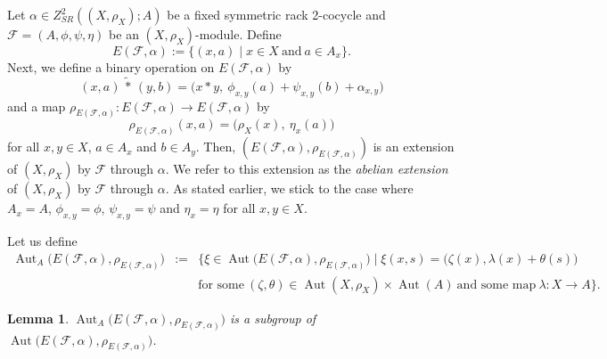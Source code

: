 \documentclass[11pt,reqno]{amsart}
\newtheorem{lemma}[theorem]{Lemma}
\theoremstyle{definition}
\numberwithin{equation}{subsection}
\begin{document}
Let $\alpha \in Z_{S R}^{2}((X, \rho_{X}); A)$ be a fixed symmetric rack 2-cocycle and $\mathcal{F}=(A, \phi, \psi, \eta)$ be an $(X, \rho_{X})$-module. Define
$$
E(\mathcal{F}, \alpha):=\big\{(x, a) \mid x \in X~\textrm{and}~ a \in A_{x} \big\}.
$$
Next, we define a binary operation on $E(\mathcal{F}, \alpha)$ by
$$
(x, a) \, \tilde{*} \,(y, b)=\big( x * y,~ \phi_{x, y}(a)+\psi_{x, y}(b)+\alpha_{x, y} \big)
$$
and a map $\rho_{E(\mathcal{F}, \alpha)}: E(\mathcal{F}, \alpha) \longrightarrow E(\mathcal{F}, \alpha)$ by
$$
\rho_{E(\mathcal{F}, \alpha)}(x, a) =\big(\rho_{X}(x), ~\eta_{x}(a)\big)
$$
for all $x, y \in X$, $a \in A_{x}$ and $b \in A_{y}$. Then, $(E(\mathcal{F}, \alpha), \rho_{E(\mathcal{F}, \alpha)})$ is an extension of $(X, \rho_{X})$ by $\mathcal{F}$ through $\alpha$. We refer to this extension as the \textit{abelian extension} of $(X, \rho_{X})$ by $\mathcal{F}$ through $\alpha$. As stated earlier, we stick to the case where $A_x=A$, $\phi_{x, y}=\phi$, $\psi_{x, y}=\psi$ and $\eta_{x}=\eta$ for all $x, y \in X$.
\par

Let us define
\begin{eqnarray*}
\operatorname{Aut}_{A} \big(E(\mathcal{F}, \alpha),\rho_{E(\mathcal{F}, \alpha)}\big)	&:=& \Big\{\xi \in \operatorname{Aut} \big(E(\mathcal{F}, \alpha),\rho_{E(\mathcal{F}, \alpha)} \big) \mid \xi(x, s)= \big(\zeta(x), \lambda(x) +\theta(s)\big) \\
	&& \text{for some}~ (\zeta, \theta) \in      \operatorname{Aut}(X, \rho_{X}) \times \operatorname{Aut}(A)~\text{and some map}~ \lambda: X \longrightarrow A\Big\}.
\end{eqnarray*}


\begin{lemma}\label{subgrouplemma}	
$\operatorname{Aut}_{A}\big(E(\mathcal{F}, \alpha),\rho_{E(\mathcal{F}, \alpha)}\big)$ is a subgroup of $\operatorname{Aut} \big(E(\mathcal{F}, \alpha),\rho_{E(\mathcal{F}, \alpha)}\big)$.
\end{lemma}
\end{document}
